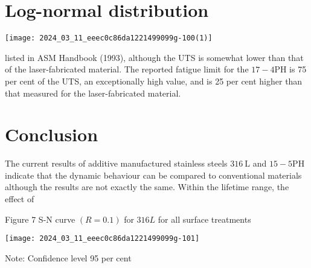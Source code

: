 \documentclass[10pt]{article}
\begin{document}
\section*{Log-normal distribution}
\begin{center}
\texttt{[image: 2024\_03\_11\_eeec0c86da1221499099g-100(1)]}
\end{center}

listed in ASM Handbook (1993), although the UTS is somewhat lower than that of the laser-fabricated material. The reported fatigue limit for the $17-4 \mathrm{PH}$ is 75 per cent of the UTS, an exceptionally high value, and is 25 per cent higher than that measured for the laser-fabricated material.

\section*{Conclusion}
The current results of additive manufactured stainless steels $316 \mathrm{~L}$ and $15-5 \mathrm{PH}$ indicate that the dynamic behaviour can be compared to conventional materials although the results are not exactly the same. Within the lifetime range, the effect of

Figure 7 S-N curve $(R=0.1)$ for $316 L$ for all surface treatments

\begin{center}
\texttt{[image: 2024\_03\_11\_eeec0c86da1221499099g-101]}
\end{center}

Note: Confidence level 95 per cent
\end{document}
